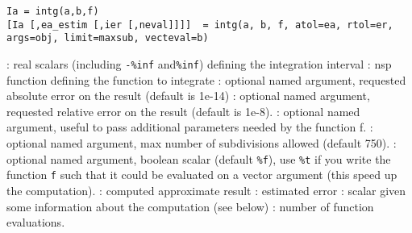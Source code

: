 
\begin{mandesc}
\end{mandesc}

\begin{calling_sequence}
\begin{verbatim}
Ia = intg(a,b,f)
[Ia [,ea_estim [,ier [,neval]]]]  = intg(a, b, f, atol=ea, rtol=er, args=obj, limit=maxsub, vecteval=b)
\end{verbatim}
\end{calling_sequence}
\begin{parameters}
  \begin{varlist}
    :  real scalars (including \verb+-%inf+ and\verb+%inf+) defining the integration interval
    : nsp function defining the function to integrate
    : optional named argument, requested absolute error
                      on the result (default is 1e-14)
    : optional named argument, requested relative error
                      on the result (default is 1e-8).
    : optional named argument, useful to pass
    additional parameters needed by the function f.
    : optional named argument, max number of
    subdivisions allowed (default 750).
    : optional named argument, boolean scalar
    (default \verb+%f+), use \verb+%t+ if you write the function
                   \verb+f+ such that it could be evaluated on a
                   vector argument (this speed up the computation).
    : computed approximate result
    : estimated error
    : scalar given some information about the computation (see below)
    : number of function evaluations.
  \end{varlist}
\end{parameters}

